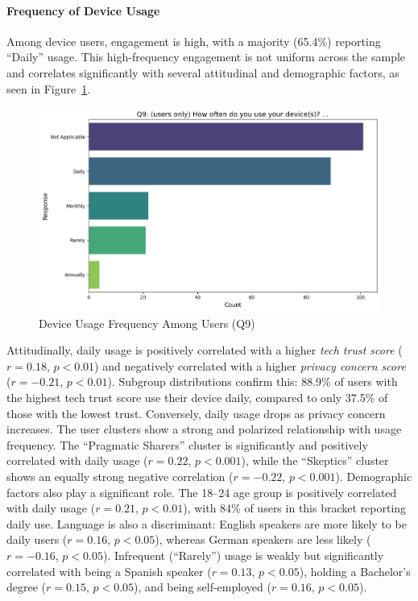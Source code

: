	\paragraph{Frequency of Device Usage}
	Among device users, engagement is high, with a majority (65.4\%) reporting ``Daily'' usage. This high-frequency engagement is not uniform across the sample and correlates significantly with several attitudinal and demographic factors, as seen in Figure~\ref{fig:Q9_usage_frequency}.
	\begin{figure}[ht]\centering
		\includegraphics[width=0.7\linewidth]{figures/questions/Q9_single_choice.png}
		\caption{Device Usage Frequency Among Users (Q9)}
		\label{fig:Q9_usage_frequency}
	\end{figure}
	Attitudinally, daily usage is positively correlated with a higher \textit{tech trust score} ($r = 0.18$, $p < 0.01$) and negatively correlated with a higher \textit{privacy concern score} ($r = -0.21$, $p < 0.01$). Subgroup distributions confirm this: 88.9\% of users with the highest tech trust score use their device daily, compared to only 37.5\% of those with the lowest trust. Conversely, daily usage drops as privacy concern increases.
	The user clusters show a strong and polarized relationship with usage frequency. The ``Pragmatic Sharers'' cluster is significantly and positively correlated with daily usage ($r = 0.22$, $p < 0.001$), while the ``Skeptics'' cluster shows an equally strong negative correlation ($r = -0.22$, $p < 0.001$).
	Demographic factors also play a significant role. The 18--24 age group is positively correlated with daily usage ($r = 0.21$, $p < 0.01$), with 84\% of users in this bracket reporting daily use. Language is also a discriminant: English speakers are more likely to be daily users ($r = 0.16$, $p < 0.05$), whereas German speakers are less likely ($r = -0.16$, $p < 0.05$). Infrequent (``Rarely'') usage is weakly but significantly correlated with being a Spanish speaker ($r = 0.13$, $p < 0.05$), holding a Bachelor's degree ($r = 0.15$, $p < 0.05$), and being self-employed ($r = 0.16$, $p < 0.05$).

